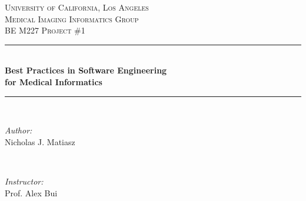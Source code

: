 \documentclass[12pt]{article} %
\begin{document}
\begin{titlepage}

\newcommand{\HRule}{\rule{\linewidth}{0.5mm}} %

\center %
 

\textsc{\Large University of California, Los Angeles}\\[1.5cm] %
\textsc{\large Medical Imaging Informatics Group}\\[0.5cm] %
\textsc{\large BE M227 Project \#{1}}\\[0.5cm] %

\vspace{20pt}
\HRule \\[0.5cm]
\LARGE{\textbf{Best Practices in Software Engineering}}\\[.3cm]
\LARGE{\textbf{for Medical Informatics}}\\
\HRule \\[1.5cm]
 

\begin{minipage}{0.4\textwidth}
\begin{flushleft} \large
\emph{Author:}\\
Nicholas J. Matiasz %
\end{flushleft}
\end{minipage}
~
\begin{minipage}{0.4\textwidth}
\begin{flushright} \large
\emph{Instructor:} \\
Prof. Alex Bui %
\end{flushright}
\end{minipage}\\[4cm]


\end{titlepage}
\end{document}
